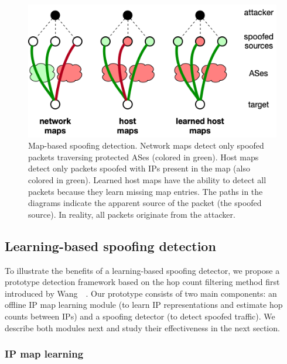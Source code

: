 \begin{figure}
	\centering
	\includegraphics[width=.8\linewidth]{Graph/spoof/learnedmaps.png}
	\caption{Map-based spoofing detection. Network maps detect only spoofed packets traversing protected ASes (colored in green). Host maps detect only packets spoofed with IPs present in the map (also colored in green). Learned host maps have the ability to detect all packets because they learn missing map entries. The paths in the diagrams indicate the apparent source of the packet (the spoofed source). In reality, all packets originate from the attacker.}
	\label{fig:learnedmaps}
	\vspace{0.5cm}
\end{figure}

\subsection{Learning-based spoofing detection}
\label{spoof:design}

To illustrate the benefits of a learning-based spoofing detector, we propose a prototype detection framework based on the hop count filtering method first introduced by Wang~\etal{}~\citep{hcf}.
Our prototype consists of two main components: an offline IP map learning module (to learn IP representations and estimate hop counts between IPs) and a spoofing detector (to detect spoofed traffic). We describe both modules next and study their effectiveness in the next section. 



\subsubsection{IP map learning}


